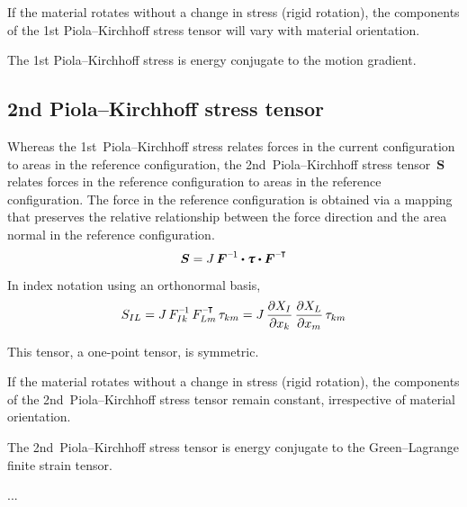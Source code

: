 {If the material rotates without a change in stress (rigid rotation), the components of the 1st Piola\hbox{--}Kirchhoff stress tensor will vary with material orientation.

The 1st Piola\hbox{--}Kirchhoff stress is energy conjugate to the motion gradient.

\subsection*{2nd Piola\hbox{--}Kirchhoff stress tensor}

Whereas the 1st~Piola\hbox{--}Kirchhoff stress relates forces in the current configuration to areas in the reference configuration, the 2nd~Piola\hbox{--}Kirchhoff stress tensor~$\bm{S}$ relates forces in the reference configuration to areas in the reference configuration. The force in the reference configuration is obtained via a mapping that preserves the relative relationship between the force direction and the area normal in the reference configuration.
\[
\bm{S} = J \, \bm{F}^{\expminusone} \dotp \cauchystress \dotp \bm{F}^{\expminusT}
\]

In index notation using an orthonormal basis,
\[
S_{IL} = J \, F_{Ik}^{\expminusone} \, F_{Lm}^{\expminusT} \, \tau_{km} =
J \, \frac{\partial X_{I}}{\partial x_{k}} \, \frac{\partial X_{L}}{\partial x_{m}} \, \tau_{km}
\]

This tensor, a one\hbox{-}point tensor, is symmetric.

If the material rotates without a change in stress (rigid rotation), the components of the 2nd~Piola\hbox{--}Kirchhoff stress tensor remain constant, irrespective of material orientation.

The 2nd~Piola\hbox{--}Kirchhoff stress tensor is energy conjugate to the Green\hbox{--}Lagrange finite strain tensor.
\par}


...




\newpage



